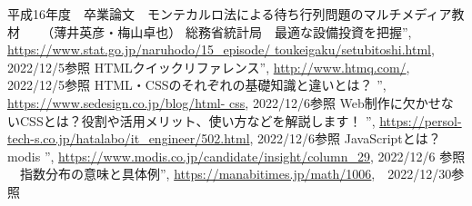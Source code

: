 \documentclass[12pt,a4j]{ltjsarticle}
\begin{document}
\begin{thebibliography}{99}
	平成16年度　卒業論文　モンテカルロ法による待ち行列問題のマルチメディア教材 　
	（薄井英彦・梅山卓也）
	 総務省統計局　最適な設備投資を把握”, \url{https://www.stat.go.jp/naruhodo/15_episode/	toukeigaku/setubitoshi.html}, 2022/12/5参照
	 HTMLクイックリファレンス”, \url{http://www.htmq.com/}, 2022/12/5参照
	HTML・CSSのそれぞれの基礎知識と違いとは？ ”, \url{https://www.sedesign.co.jp/blog/html-	css}, 2022/12/6参照
	Web制作に欠かせないCSSとは？役割や活用メリット、使い方などを解説します！ ”, 		\url{https://persol-tech-s.co.jp/hatalabo/it_engineer/502.html}, 2022/12/6参照
	JavaScriptとは？　modis ”, \url{https://www.modis.co.jp/candidate/insight/column_29}, 2022/12/6	参照
	　指数分布の意味と具体例”,  \url{https://manabitimes.jp/math/1006},　2022/12/30参照
\end{thebibliography}
\end{document}

